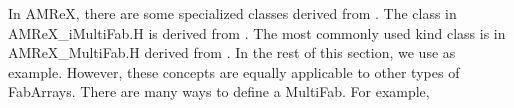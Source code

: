 \documentclass[letterpaper,10pt,english]{sphinxmanual}
\begin{document}
\sphinxAtStartPar
In AMReX, there are some specialized classes derived from . The
 class in AMReX\_iMultiFab.H is derived from
. The most commonly used  kind class
is  in AMReX\_MultiFab.H derived from .
In the rest of this section, we use  as example. However, these
concepts are equally applicable to other types of FabArrays. There are many
ways to define a MultiFab. For example,

\begin{sphinxVerbatim}[commandchars=\\\{\}]
   
   
    
\end{sphinxVerbatim}
\end{document}
